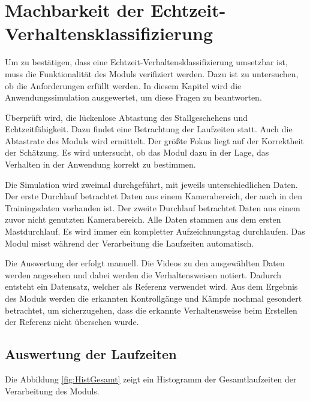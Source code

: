 \section{Machbarkeit der Echtzeit-Verhaltensklassifizierung} \label{sec:Ergeb Sim}
Um zu bestätigen, dass eine Echtzeit-Verhaltensklassifizierung umsetzbar ist, muss die Funktionalität des Moduls verifiziert werden. Dazu ist zu untersuchen, ob die Anforderungen erfüllt werden. In diesem Kapitel wird die Anwendungssimulation ausgewertet, um diese Fragen zu beantworten. \par

Überprüft wird, die lückenlose Abtastung des Stallgeschehens und Echtzeitfähigkeit. Dazu findet eine Betrachtung der Laufzeiten statt. Auch die Abtastrate des Moduls wird ermittelt. Der größte Fokus liegt auf der Korrektheit der Schätzung. Es wird untersucht, ob das Modul dazu in der Lage, das Verhalten in der Anwendung korrekt zu bestimmen. \par

Die Simulation wird zweimal durchgeführt, mit jeweils unterschiedlichen Daten. Der erste Durchlauf betrachtet Daten aus einem Kamerabereich, der auch in den Trainingsdaten vorhanden ist. Der zweite Durchlauf betrachtet Daten aus einem zuvor nicht genutzten Kamerabereich. Alle Daten stammen aus dem ersten Mastdurchlauf. Es wird immer ein kompletter Aufzeichnungstag durchlaufen. Das Modul misst während der Verarbeitung die Laufzeiten automatisch. \par

Die Auswertung der erfolgt manuell. Die Videos zu den ausgewählten Daten werden angesehen und dabei werden die Verhaltensweisen notiert. Dadurch entsteht ein Datensatz, welcher als Referenz verwendet wird. Aus dem Ergebnis des Moduls werden die erkannten Kontrollgänge und Kämpfe nochmal gesondert betrachtet, um sicherzugehen, dass die erkannte Verhaltensweise beim Erstellen der Referenz nicht übersehen wurde.\par

\subsection{Auswertung der Laufzeiten}

Die Abbildung \ref{fig:HistGesamt} zeigt ein Histogramm der Gesamtlaufzeiten der Verarbeitung des Moduls.  


